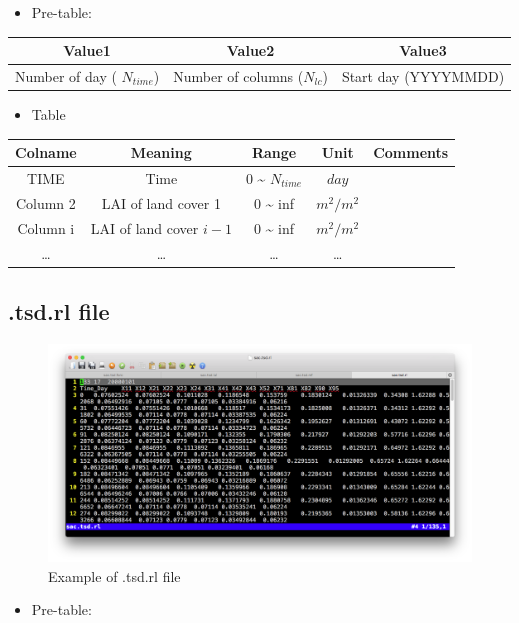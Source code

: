 \documentclass[]{scrbook}
\providecommand{\tightlist}{%
  \setlength{\itemsep}{0pt}\setlength{\parskip}{0pt}}
\begin{document}
\begin{itemize}
\tightlist
\item
  Pre-table:
\end{itemize}

\begin{longtable}[]{@{}ccc@{}}
\toprule
Value1 & Value2 & Value3\tabularnewline
\midrule
\endhead
Number of day ( \(N_{time}\)) & Number of columns (\(N_{lc}\)) & Start
day (YYYYMMDD)\tabularnewline
\bottomrule
\end{longtable}

\begin{itemize}
\tightlist
\item
  Table
\end{itemize}

\begin{longtable}[]{@{}ccccc@{}}
\toprule
Colname & Meaning & Range & Unit & Comments\tabularnewline
\midrule
\endhead
TIME & Time & 0 \textasciitilde{} \(N_{time}\) & \(day\)
&\tabularnewline
Column 2 & LAI of land cover 1 & 0 \textasciitilde{} inf & \(m^2/m^2\)
&\tabularnewline
Column i & LAI of land cover \(i-1\) & 0 \textasciitilde{} inf &
\(m^2/m^2\) &\tabularnewline
\ldots{} & \ldots{} & \ldots{} & \ldots{} &\tabularnewline
\bottomrule
\end{longtable}

\subsection{.tsd.rl file}\label{tsd.rl-file}

\begin{figure}
\centering
\includegraphics{Fig/IO/tsd.rl.png}
\caption{Example of .tsd.rl file}
\end{figure}

\begin{itemize}
\tightlist
\item
  Pre-table:
\end{itemize}
\end{document}
